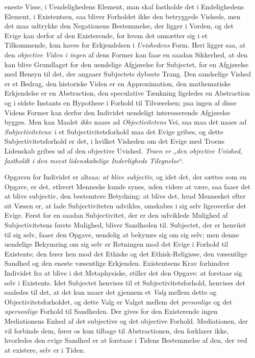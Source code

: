 \documentclass[12pt,a4paper]{book}
\newcommand{\opage}[1]{\marginnote{\footnotesize\textit{[#1]}}}
\begin{document}
eneste Visse, i Uendelighedens Element, man skal fastholde det i
Endelighedens Element, i Existentsen, saa bliver Forholdet ikke den
betryggede Visheds, men det maa udtrykke den Negationens Bestemmelse,
der ligger i Vorden, og det Evige kan derfor af den Existerende, for
hvem det omsætter sig i et Tilkommende, kun haves for Erkjendelsen i \emph{Uvishedens} Form. Heri ligger saa, at den \emph{objective Viden i ingen} af
dens Former kan faae en saadan Sikkerhed, at den kan blive Grundlaget
for den uendelige Afgjørelse for Subjectet, for en Afgjørelse med
Hensyn til det, der angaaer Subjectets dybeste Trang. Den sandselige
Vished er et Bedrag, den historiske Viden er en Approximation, den
mathematiske Erkjendelse er en Abstraction, den speculative Tænkning
ligeledes en Abstraction og i sidste Instants en Hypothese i Forhold
til Tilværelsen; paa ingen af disse Videns Former kan derfor den
Individet uendeligt \opage{120}interesserende Afgjørelse bygges. Men kan Maalet \emph{ikke} naaes ad \emph{Objectivitetens} Vei, saa maa det naaes ad
\emph{Subjectivitetens}: i et Subjectivitetsforhold maa det Evige gribes, og
dette Subjectivitetsforhold er det, i hvilket Visheden om det Evige med
Troens Lidenskab gribes ud af den objective Uvished. \emph{Troen er} „\emph{den
objective Uvished, fastholdt i den meest lidenskabelige Inderligheds
Tilegnelse}“.

Opgaven for Individet er altsaa: \emph{at blive subjectiv}, og idet det, der
sættes som en Opgave, er det, ethvert Menneske kunde synes, uden videre
at være, saa faaer det at blive subjectiv, den bestemtere Betydning:
at blive det, hvad Mennesket efter sit Væsen er, at lade
Subjectiviteten udvikles, omskabes i sig selv ligeoverfor det Evige.
Først for en saadan Subjectivitet, der er den udviklede Mulighed af
Subjectivitetens første Mulighed, bliver Sandheden til. Subjectet, der
er henviist til sig selv, faaer den Opgave, uendelig at bekymre sig om
sig selv; men denne uendelige Bekymring om sig selv er Retningen mod
det Evige i Forhold til Existents; den fører hen mod det Ethiske og det
Ethisk-Religiøse, den væsentlige Sandhed og den eneste væsentlige
Erkjenden. Existentsens Krav forhindrer Individet fra at blive i det
Metaphysiske, stiller det den Opgave: at forstaae sig selv i Existents.
Idet Subjectet henvises til et Subjectivitetsforhold, henvises det
saaledes til det, at det kun naaer det gjennem et \emph{Valg} mellem dette og
Objectivitetsforholdet, og dette Valg er Valget mellem det \emph{personlige} og det \emph{upersonlige} Forhold til Sandheden. Der gives for den Existerende
ingen Mediationens Enhed af det subjective og det objective Forhold.
Mediationen, der vil forbinde dem, fører os kun tilbage til
Abstractionen, den forklarer ikke, hvorledes den evige Sandhed er at
forstaae i Tidens Bestemmelse af den, der ved at existere, selv er i
Tiden.
\end{document}
